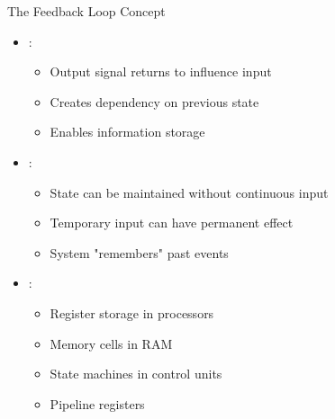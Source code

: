 \begin{frame}{The Feedback Loop Concept}
\begin{itemize}
\item {}:
\begin{itemize}
\item Output signal returns to influence input
\item Creates dependency on previous state
\item Enables information storage
\end{itemize}
\vspace{0.5cm}
\item {}:
\begin{itemize}
\item State can be maintained without continuous input
\item Temporary input can have permanent effect
\item System "remembers" past events
\end{itemize}
\vspace{0.5cm}
\item {}:
\begin{itemize}
\item Register storage in processors
\item Memory cells in RAM
\item State machines in control units
\item Pipeline registers
\end{itemize}
\end{itemize}
\end{frame}

